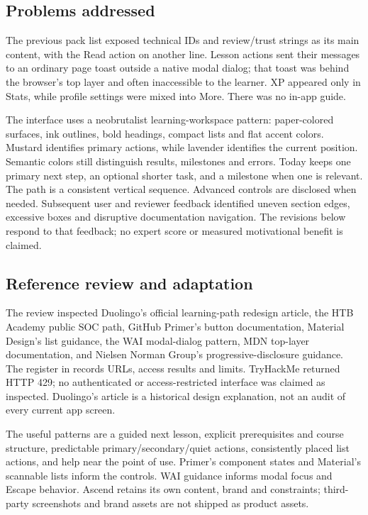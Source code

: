 \subsection{Problems addressed}
The previous pack list exposed technical IDs and review/trust strings as its main
content, with the Read action on another line. Lesson actions sent their messages
to an ordinary page toast outside a native modal dialog; that toast was behind the
browser's top layer and often inaccessible to the learner. XP appeared only in
Stats, while profile settings were mixed into More. There was no in-app guide.

The interface uses a neobrutalist learning-workspace pattern: paper-colored
surfaces, ink outlines, bold headings, compact lists and flat accent colors.
Mustard identifies primary actions, while lavender identifies the current position.
Semantic colors still distinguish results, milestones and errors.
Today keeps one primary next step, an optional shorter task, and a milestone when
one is relevant. The path is a consistent vertical sequence. Advanced controls
are disclosed when needed. Subsequent user and reviewer feedback identified
uneven section edges, excessive boxes and disruptive documentation navigation.
The revisions below respond to that feedback; no expert score or measured
motivational benefit is claimed.

\subsection{Reference review and adaptation}
The review inspected Duolingo's official learning-path redesign article, the HTB
Academy public SOC path, GitHub Primer's button documentation, Material Design's
list guidance, the WAI modal-dialog pattern, MDN top-layer documentation, and
Nielsen Norman Group's progressive-disclosure guidance. The register in
 records URLs, access results and limits.
TryHackMe returned HTTP 429; no authenticated or access-restricted interface was
claimed as inspected. Duolingo's article is a historical design explanation, not
an audit of every current app screen.

The useful patterns are a guided next lesson, explicit prerequisites and course
structure, predictable primary/secondary/quiet actions, consistently placed list
actions, and help near the point of use. Primer's component states and Material's
scannable lists inform the controls. WAI guidance informs modal focus and Escape
behavior. Ascend retains its own content, brand and constraints; third-party
screenshots and brand assets are not shipped as product assets.

